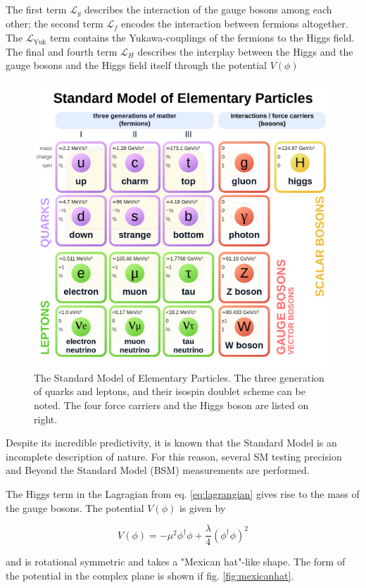 The first term $\mathcal{L}_g$ describes the interaction of the gauge bosons among each other; the second term $\mathcal{L}_f$ encodes the interaction between fermions altogether. The $\mathcal{L}_\text{Yuk}$ term contains the Yukawa-couplings of the fermions to the Higgs field. The final and fourth term $\mathcal{L}_H$ describes the interplay between the Higgs and the gauge bosons and the Higgs field itself through the potential $V(\phi)$

\begin{figure}[h!]
	\centering
	\includegraphics[width=0.6\linewidth]{figures/theory/sm.png}
	\caption{The Standard Model of Elementary Particles. The three generation of quarks and leptons, and their isospin doublet scheme can be noted. The four force carriers and the Higgs boson are listed on right. \cite{enwiki:1101993746}}
	\label{fig:sm}
\end{figure}

Despite its incredible predictivity, it is known that the Standard Model is an incomplete description of nature. For this reason, several SM testing precision and Beyond the Standard Model (BSM) measurements are performed.

The Higgs term in the Lagragian from eq. \ref{eq:lagrangian} gives rise to the mass of the gauge bosons. The potential $V(\phi)$ is given by

\begin{equation*}
	V(\phi) = -\mu^2 \phi^\dagger \phi + \frac{\lambda}{4}\left(\phi^\dagger\phi\right)^2 
\end{equation*}

and is rotational symmetric and takes a "Mexican hat"-like shape. The form of the potential in the complex plane is shown if fig. \ref{fig:mexicanhat}.

